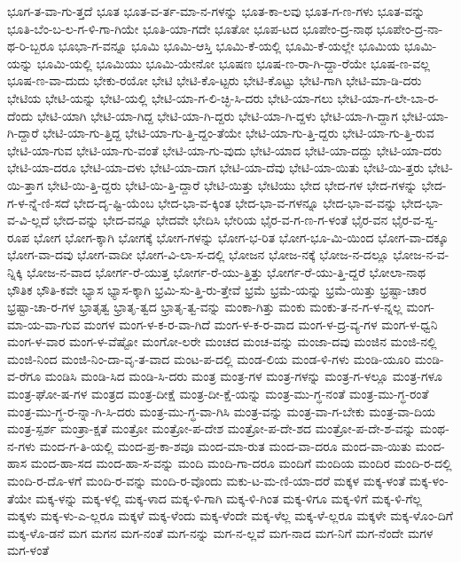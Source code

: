 {ಭೂಗ-ತ-ವಾ-ಗು-ತ್ತದೆ
ಭೂತ
ಭೂತ-ವ-ರ್ತ-ಮಾ-ನ-ಗಳನ್ನು
ಭೂತ-ಕಾ-ಲವು
ಭೂತ-ಗ-ಣ-ಗಳು
ಭೂತ-ವನ್ನು
ಭೂತಿ-ಬೆಂ-ಬ-ಲ-ಗ-ಳಿ-ಗಾ-ಗಿಯೇ
ಭೂತಿ-ಯಾ-ಗದೇ
ಭೂತೋ
ಭೂಪ-ಟದ
ಭೂಪೇಂ-ದ್ರ-ನಾಥ
ಭೂಪೇಂ-ದ್ರ-ನಾ-ಥ-ರಿ-ಬ್ಬರೂ
ಭೂಭಾ-ಗ-ವನ್ನೂ
ಭೂಮಿ
ಭೂಮಿ-ಆಸ್ತಿ
ಭೂಮಿ-ಕೆ-ಯಲ್ಲಿ
ಭೂಮಿ-ಕೆ-ಯಲ್ಲೇ
ಭೂಮಿಯ
ಭೂಮಿ-ಯನ್ನು
ಭೂಮಿ-ಯಲ್ಲಿ
ಭೂಮಿಯು
ಭೂಮಿ-ಯೇನೋ
ಭೂಷಣ
ಭೂಷ-ಣ-ರಾ-ಗಿ-ದ್ದಾ-ರೆಯೇ
ಭೂಷ-ಣ-ವಲ್ಲ
ಭೂಷ-ಣ-ವಾ-ದುದು
ಭೇಕು-ರಯೋ
ಭೇಟಿ
ಭೇಟಿ-ಕೊ-ಟ್ಟರು
ಭೇಟಿ-ಕೊಟ್ಟು
ಭೇಟಿ-ಗಾಗಿ
ಭೇಟಿ-ಮಾ-ಡಿ-ದರು
ಭೇಟಿಯ
ಭೇಟಿ-ಯನ್ನು
ಭೇಟಿ-ಯಲ್ಲಿ
ಭೇಟಿ-ಯಾ-ಗ-ಲಿ-ಚ್ಛಿ-ಸಿ-ದರು
ಭೇಟಿ-ಯಾ-ಗಲು
ಭೇಟಿ-ಯಾ-ಗ-ಲೇ-ಬಾ-ರ-ದೆಂದು
ಭೇಟಿ-ಯಾಗಿ
ಭೇಟಿ-ಯಾ-ಗಿದ್ದ
ಭೇಟಿ-ಯಾ-ಗಿ-ದ್ದರು
ಭೇಟಿ-ಯಾ-ಗಿ-ದ್ದಳು
ಭೇಟಿ-ಯಾ-ಗಿ-ದ್ದಾಗ
ಭೇಟಿ-ಯಾ-ಗಿ-ದ್ದಾರೆ
ಭೇಟಿ-ಯಾ-ಗು-ತ್ತಿದ್ದ
ಭೇಟಿ-ಯಾ-ಗು-ತ್ತಿ-ದ್ದಂ-ತೆಯೇ
ಭೇಟಿ-ಯಾ-ಗು-ತ್ತಿ-ದ್ದರು
ಭೇಟಿ-ಯಾ-ಗು-ತ್ತಿ-ರುವ
ಭೇಟಿ-ಯಾ-ಗುವ
ಭೇಟಿ-ಯಾ-ಗು-ವಂತೆ
ಭೇಟಿ-ಯಾ-ಗು-ವುದು
ಭೇಟಿ-ಯಾದ
ಭೇಟಿ-ಯಾ-ದದ್ದು
ಭೇಟಿ-ಯಾ-ದರು
ಭೇಟಿ-ಯಾ-ದರೂ
ಭೇಟಿ-ಯಾ-ದಳು
ಭೇಟಿ-ಯಾ-ದಾಗ
ಭೇಟಿ-ಯಾ-ದೆವು
ಭೇಟಿ-ಯಾ-ಯಿತು
ಭೇಟಿ-ಯಿ-ತ್ತರು
ಭೇಟಿ-ಯಿ-ತ್ತಾಗ
ಭೇಟಿ-ಯಿ-ತ್ತಿ-ದ್ದರು
ಭೇಟಿ-ಯಿ-ತ್ತಿ-ದ್ದಾರೆ
ಭೇಟಿ-ಯಿತ್ತು
ಭೇಟಿಯು
ಭೇದ
ಭೇದ-ಗಳ
ಭೇದ-ಗಳನ್ನು
ಭೇದ-ಗ-ಳ-ನ್ನೆ-ಣಿ-ಸದೆ
ಭೇದ-ದೃ-ಷ್ಟಿ-ಯೆಂಬ
ಭೇದ-ಭಾ-ವ-ಕ್ಕಿಂತ
ಭೇದ-ಭಾ-ವ-ಗಳನ್ನೂ
ಭೇದ-ಭಾ-ವ-ವನ್ನು
ಭೇದ-ಭಾ-ವ-ವಿ-ಲ್ಲದೆ
ಭೇದ-ವನ್ನು
ಭೇದ-ವನ್ನೂ
ಭೇದವೇ
ಭೇದಿಸಿ
ಭೇರಿಯ
ಭೈರ-ವ-ಗ-ಣ-ಗ-ಳಂತೆ
ಭೈರ-ವನ
ಭೈರ-ವ-ಸ್ವ-ರೂಪ
ಭೋಗ
ಭೋಗ-ಕ್ಕಾಗಿ
ಭೋಗಕ್ಕೆ
ಭೋಗ-ಗಳನ್ನು
ಭೋಗ-ಭ-ರಿತ
ಭೋಗ-ಭೂ-ಮಿ-ಯಿಂದ
ಭೋಗ-ವಾ-ದಕ್ಕೂ
ಭೋಗ-ವಾ-ದವು
ಭೋಗ-ವಾದೀ
ಭೋಗ-ವಿ-ಲಾ-ಸ-ದಲ್ಲಿ
ಭೋಜನ
ಭೋಜ-ನಕ್ಕೆ
ಭೋಜ-ನ-ದಲ್ಲೂ
ಭೋಜ-ನ-ವ-ನ್ನಿಕ್ಕಿ
ಭೋಜ-ನ-ವಾದ
ಭೋರ್ಗ-ರೆ-ಯುತ್ತ
ಭೋರ್ಗ-ರೆ-ಯು-ತ್ತಿತ್ತು
ಭೋರ್ಗ-ರೆ-ಯು-ತ್ತಿ-ದ್ದರೆ
ಭೋಲಾ-ನಾಥ
ಭೌತಿಕ
ಭೌತಿ-ಕವೇ
ಭ್ಯಾಸ
ಭ್ಯಾಸ-ಕ್ಕಾಗಿ
ಭ್ರಮಿ-ಸು-ತ್ತಿ-ರು-ತ್ತೇವೆ
ಭ್ರಮೆ
ಭ್ರಮೆ-ಯನ್ನು
ಭ್ರಮೆ-ಯಿತ್ತು
ಭ್ರಷ್ಟಾ-ಚಾರ
ಭ್ರಷ್ಟಾ-ಚಾ-ರ-ಗಳ
ಭ್ರಾತೃತ್ವ
ಭ್ರಾತೃ-ತ್ವದ
ಭ್ರಾತೃ-ತ್ವ-ವನ್ನು
ಮಂಕಾ-ಗಿತ್ತು
ಮಂಕು
ಮಂಕು-ತ-ನ-ಗ-ಳ-ನ್ನಲ್ಲ
ಮಂಗ-ಮಾ-ಯ-ವಾ-ಗುವ
ಮಂಗಳ
ಮಂಗ-ಳ-ಕ-ರ-ವಾ-ಗಿದೆ
ಮಂಗ-ಳ-ಕ-ರ-ವಾದ
ಮಂಗ-ಳ-ದ್ರ-ವ್ಯ-ಗಳ
ಮಂಗ-ಳ-ಧ್ವನಿ
ಮಂಗ-ಳ-ವಾರ
ಮಂಗ-ಳ-ವೆಷ್ಟೋ
ಮಂಗೋ-ಲರೇ
ಮಂಚದ
ಮಂಚ-ವನ್ನು
ಮಂಜಾ-ದವು
ಮಂಜಿನ
ಮಂಜಿ-ನಲ್ಲಿ
ಮಂಜಿ-ನಿಂದ
ಮಂಜಿ-ನಿಂ-ದಾ-ವೃ-ತ-ವಾದ
ಮಂಟ-ಪ-ದಲ್ಲಿ
ಮಂಡ-ಲಿಯ
ಮಂಡ-ಳಿ-ಗಳು
ಮಂಡಿ-ಯೂರಿ
ಮಂಡಿ-ವ-ರೆಗೂ
ಮಂಡಿಸಿ
ಮಂಡಿ-ಸಿದ
ಮಂಡಿ-ಸಿ-ದರು
ಮಂತ್ರ
ಮಂತ್ರ-ಗಳ
ಮಂತ್ರ-ಗಳನ್ನು
ಮಂತ್ರ-ಗ-ಳಲ್ಲೂ
ಮಂತ್ರ-ಗಳೂ
ಮಂತ್ರ-ಘೋ-ಷ-ಗಳ
ಮಂತ್ರದ
ಮಂತ್ರ-ದೀಕ್ಷೆ
ಮಂತ್ರ-ದೀ-ಕ್ಷೆ-ಯನ್ನು
ಮಂತ್ರ-ಮು-ಗ್ಧ-ನಂತೆ
ಮಂತ್ರ-ಮು-ಗ್ಧ-ರಂತೆ
ಮಂತ್ರ-ಮು-ಗ್ಧ-ರ-ನ್ನಾ-ಗಿ-ಸಿ-ದರು
ಮಂತ್ರ-ಮು-ಗ್ಧ-ವಾ-ಗಿಸಿ
ಮಂತ್ರ-ವನ್ನು
ಮಂತ್ರ-ವಾ-ಗ-ಬೇಕು
ಮಂತ್ರ-ವಾ-ದಿಯ
ಮಂತ್ರ-ಸ್ಪರ್ಶ
ಮಂತ್ರಾ-ಕ್ಷತೆ
ಮಂತ್ರೋ
ಮಂತ್ರೋ-ಪ-ದೇಶ
ಮಂತ್ರೋ-ಪ-ದೇ-ಶದ
ಮಂತ್ರೋ-ಪ-ದೇ-ಶ-ವನ್ನು
ಮಂಥ-ನ-ಗಳು
ಮಂದ-ಗ-ತಿ-ಯಲ್ಲಿ
ಮಂದ-ಪ್ರ-ಕಾ-ಶವೂ
ಮಂದ-ಮಾ-ರುತ
ಮಂದ-ವಾ-ದರೂ
ಮಂದ-ವಾ-ಯಿತು
ಮಂದ-ಹಾಸ
ಮಂದ-ಹಾ-ಸದ
ಮಂದ-ಹಾ-ಸ-ವನ್ನು
ಮಂದಿ
ಮಂದಿ-ಗಾ-ದರೂ
ಮಂದಿಗೆ
ಮಂದಿಯ
ಮಂದಿರ
ಮಂದಿ-ರ-ದಲ್ಲಿ
ಮಂದಿ-ರ-ದೊ-ಳಗೆ
ಮಂದಿ-ರ-ವನ್ನು
ಮಂದಿ-ರ-ವೊಂದು
ಮಕು-ಟ-ಮ-ಣಿ-ಯಾ-ದರೆ
ಮಕ್ಕಳ
ಮಕ್ಕ-ಳಂತೆ
ಮಕ್ಕ-ಳಂ-ತೆಯೇ
ಮಕ್ಕ-ಳನ್ನು
ಮಕ್ಕ-ಳಲ್ಲಿ
ಮಕ್ಕ-ಳಾದ
ಮಕ್ಕ-ಳಿ-ಗಾಗಿ
ಮಕ್ಕ-ಳಿ-ಗಿಂತ
ಮಕ್ಕ-ಳಿಗೂ
ಮಕ್ಕ-ಳಿಗೆ
ಮಕ್ಕ-ಳಿ-ಗೆಲ್ಲ
ಮಕ್ಕಳು
ಮಕ್ಕ-ಳು-ಎ-ಲ್ಲರೂ
ಮಕ್ಕಳೆ
ಮಕ್ಕ-ಳೆಂದು
ಮಕ್ಕ-ಳೆಂದೇ
ಮಕ್ಕ-ಳೆಲ್ಲ
ಮಕ್ಕ-ಳೆ-ಲ್ಲರೂ
ಮಕ್ಕಳೇ
ಮಕ್ಕ-ಳೊಂ-ದಿಗೆ
ಮಕ್ಕ-ಳೊ-ಡನೆ
ಮಗ
ಮಗನ
ಮಗ-ನಂತೆ
ಮಗ-ನನ್ನು
ಮಗ-ನ-ಲ್ಲವೆ
ಮಗ-ನಾದ
ಮಗ-ನಿಗೆ
ಮಗ-ನೆಂದೇ
ಮಗಳ
ಮಗ-ಳಂತೆ
}
